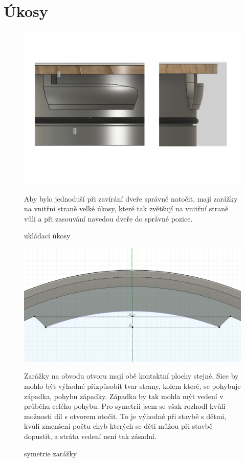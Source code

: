 \section{Úkosy}

\begin{figure}[htbp]  
    \centering
    \includegraphics[width=400pt]{kapitoly/obrazky/E4/ukozy/ukladaci_ukosy.pdf}
    \caption{ukládací úkosy}
    Aby bylo jednoduší při zavírání dveře správně natočit, mají zarážky na vnitřní straně velké úkosy, které tak zvětšují na vnitřní straně 
    vůli a při zasouvání navedou dveře do správné pozice.
    \label{fig:E4-ukosy}
\end{figure}

\begin{figure}[htbp]
    \centering
    \includegraphics[width=400pt]{kapitoly/obrazky/E4/ukozy/simetrie_zarazek.png}
    \caption{symetrie zarážky}
    Zarážky na obvodu otvoru mají obě kontaktní plochy stejné. Sice by mohlo být výhodné přizpůsobit tvar strany, kolem které, se pohybuje západka, 
    pohybu západky. Západka by tak mohla mýt vedení v průběhu celého pohybu. Pro symetrii jsem se však rozhodl kvůli možnosti díl s otvorem otočit.
    To je výhodné při stavbě s dětmi, kvůli zmenšení počtu chyb kterých se děti můžou při stavbě dopustit, a stráta vedení není tak zásadní.
    \label{fig:E4-simetrie_zarazky}
\end{figure}

\clearpage
\newpage